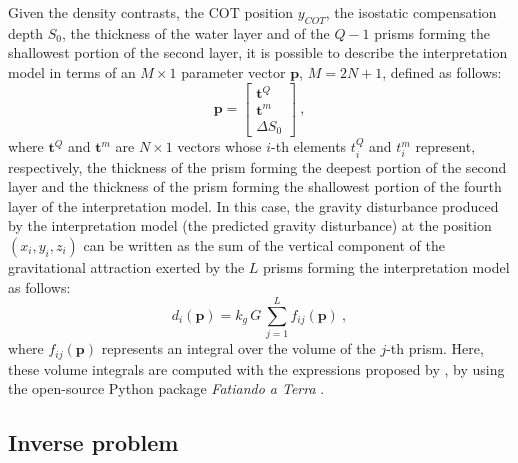 \documentclass[manuscript]{geophysics}
\begin{document}
Given the density contrasts, the COT position $y_{COT}$, the isostatic compensation
depth $S_{0}$, the thickness of the water layer and of the $Q-1$ prisms forming the
shallowest portion of the second layer, it is possible to describe the interpretation
model in terms of an $M \times 1$ parameter vector $\mathbf{p}$, $M = 2N + 1$, defined
as follows:
\begin{equation}
\mathbf{p} = \begin{bmatrix}
\mathbf{t}^{Q} \\
\mathbf{t}^{m} \\
\Delta S_{0}
\end{bmatrix} \: ,
\label{eq:parameter-vector}
\end{equation}
where $\mathbf{t}^{Q}$ and $\mathbf{t}^{m}$ are $N \times 1$ vectors whose $i$-th
elements $t^{Q}_{i}$ and $t^{m}_{i}$ represent, respectively, the thickness of the
prism forming the deepest portion of the second layer and the thickness of the prism
forming the shallowest portion of the fourth layer of the interpretation model.
In this case, the gravity disturbance produced by the interpretation model (the
predicted gravity disturbance) at the position $(x_{i}, y_{i}, z_{i})$ can be written
as the sum of the vertical component of the gravitational attraction exerted by the $L$
prisms forming the interpretation model as follows:
\begin{equation}
d_{i}(\mathbf{p}) = k_{g} \, G \, \sum_{j = 1}^{L} f_{ij}(\mathbf{p}) \: ,
\label{eq:ith-predicted-data}
\end{equation}
where $f_{ij}(\mathbf{p})$ represents an integral over the volume of the $j$-th 
prism. Here, these volume integrals are computed with the expressions proposed 
by \citet{nagy-etal2000}, by using the open-source Python package 
\textit{Fatiando a Terra} \citep{uieda-etal2013}.


\subsection{Inverse problem}
\end{document}
